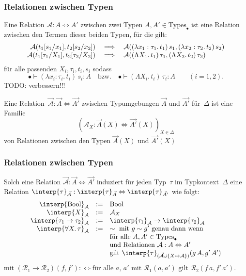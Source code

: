 \documentclass{beamer}
\newcommand{\defeq}{:=} %
\newcommand{\defiff}{:\Leftrightarrow} %
\newcommand{\Bool}{\text{Bool}}
\newcommand{\fa}[1]{\forall {#1}.\,}
\newcommand{\lam}[1]{\lambda #1.\,}
\newcommand{\Lam}[1]{\Lambda #1.\,}
\newcommand{\Types}{\text{Types}}
\newcommand{\emptyCtx}{\bullet}
\newcommand{\typeInterp}[2]{\interp{#2}_{#1}}
\newcommand{\relInterp}[2]{\interp{#2}_{#1}}
\newcommand{\Rel}[3]{#1 : #2 \Leftrightarrow #3}
\renewcommand{\emph}[1]{\textcolor{Emph}{#1}}
\begin{document}
\begin{frame}
  \frametitle{Relationen zwischen Typen}

  Eine \emph{Relation} $\Rel{\mathcal{A}}{A}{A'}$ zwischen zwei Typen $A, A' \in \Types_\bullet$ ist eine Relation zwischen den Termen dieser beiden Typen, für die gilt:
  \[\begin{array}{r c l}
    \mathcal{A}(t_1[s_1/x_1], t_2[s_2/x_2]) &\implies&
    \mathcal{A}((\lam{x_1:\tau_1} t_1)\,s_1, (\lam{x_2:\tau_2} t_2)\,s_2) \\
    \mathcal{A}(t_1[\tau_1/X_1], t_2[\tau_2/X_2]) &\implies&
    \mathcal{A}((\Lam{X_1} t_1)\,\tau_1, (\Lam{X_2} t_2)\,\tau_2)
  \end{array}\]
  für alle passenden $X_i, \tau_i, t_i, s_i$ sodass
  \[
    \emptyCtx \vdash (\lam{x_i:\tau_i} t_i)\,s_i : A
    \quad \text{bzw.} \quad
    \emptyCtx \vdash (\Lam{X_i} t_i)\,\tau_i : A
    \qquad (i = 1,2).
  \]
  TODO: verbessern!!!

  Eine \emph{Relation}~$\Rel{\vec{\mathcal{A}}}{\vec{A}}{\vec{A'}}$ zwischen Typumgebungen $\vec{A}$ und $\vec{A'}$ für~$\Delta$ ist eine Familie
  \[ (\Rel{\mathcal{A}_X}{\vec{A}(X)}{\vec{A'}(X)})_{X \in \Delta} \]
  von Relationen zwischen den Typen $\vec{A}(X)$ und $\vec{A'}(X)$
\end{frame}

\begin{frame}
  \frametitle{Relationen zwischen Typen}
  Solch eine Relation $\Rel{\vec{\mathcal{A}}}{\vec{A}}{\vec{A'}}$ induziert für jeden Typ~$\tau$ im Typkontext~$\Delta$ eine Relation $\Rel{\relInterp{\vec{\mathcal{A}}}{\tau}}{\typeInterp{\vec{A}}{\tau}}{\typeInterp{\vec{A'}}{\tau}}$ wie folgt:
  \[
    \begin{array}{r c l}
      \relInterp{\mathcal{A}}{\Bool} &\defeq& \Bool \\
      \relInterp{\mathcal{A}}{X} &\defeq& \mathcal{A}_X \\
      \relInterp{\mathcal{A}}{\tau_1 \to \tau_2} &\defeq& \relInterp{\mathcal{A}}{\tau_1} \to \relInterp{\mathcal{A}}{\tau_2} \\
      \relInterp{\mathcal{A}}{\fa{X} \tau} &\defeq& \sim \text{ mit } g \sim g' \text{ genau dann wenn} \\
      && \text{für alle $A, A' \in \Types_\emptyCtx$} \\
      && \text{und Relationen $\Rel{\mathcal{A}}{A}{A'}$} \\
      && \text{gilt } \relInterp{(\vec{\mathcal{A}} \cup \{X \mapsto \mathcal{A}\})}{\tau}(g\,A, g'\,A')
    \end{array}
  \]
  mit $(\mathcal{R}_1 \to \mathcal{R}_2)(f, f') \defiff \text{für alle $a$, $a'$ mit $\mathcal{R}_1(a, a')$ gilt $\mathcal{R}_2(f\,a, f'\,a')$}$.
\end{frame}
\end{document}
